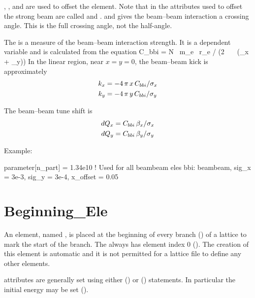 , , and  are used to offset the
 element. Note that in \mad the attributes used to
offset the strong beam are called  and .
 and  gives the beam--beam interaction a
crossing angle. This is the full crossing angle, not the half-angle.

The  is a measure of the beam--beam interaction
strength.  It is a dependent variable and is calculated from the
equation
\Begineq
  C_{bbi} = N \, m_e \, r_e / (2 \, \pi \, \gamma \, (\sigma_x + \sigma_y))
\Endeq
In the linear region, near $x = y = 0$, the 
beam--beam kick is approximately 
\begin{align}
  k_x &= -4\, \pi \, x \, C_{bbi} / \sigma_x \nonumber \\
  k_y &= -4\, \pi \, y \, C_{bbi} / \sigma_y 
\end{align}

The beam--beam tune shift is 
\begin{align}
  dQ_x &= C_{bbi} \, \beta_x / \sigma_x \nonumber \\
  dQ_y &= C_{bbi} \, \beta_y / \sigma_y \nonumber \\
\end{align}

Example:
\begin{example}
  parameter[n_part] = 1.34e10     ! Used for all beambeam eles
  bbi: beambeam, sig_x = 3e-3, sig_y = 3e-4, x_offset = 0.05
\end{example}

\section{Beginning_Ele}
\label{s:begin.ele}

An  element, named , is placed at the beginning of every
branch () of a lattice to mark the start of the branch. The
 always has element index 0 (). The creation of
this  element is automatic and it is not permitted for a lattice file to
define any other  elements.

 attributes are generally set using either 
() or  () statements.
In particular the initial energy may be set ().

